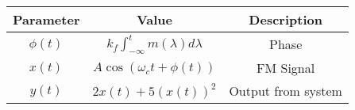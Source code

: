 \begin{tabular}{|c|c|c|}
    \hline
     \textbf{Parameter} & \textbf{Value} &
     \textbf{Description}\\
    \hline 
     $\phi(t)$ &  $k_f \int_{-\infty}^{t} m(\lambda) d\lambda$ & Phase\\
    \hline 
     $x(t)$ &  $A \cos(\omega_c t + \phi(t))$ & FM Signal\\
     
    \hline
     $y(t)$ & $2x(t) + 5(x(t))^2 $ & Output from system  \\
      \hline
      
    
  
								      
\end{tabular}